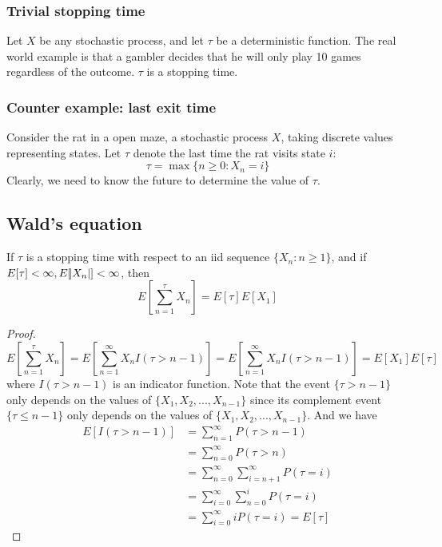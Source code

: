 \begin{refsection}
\subsubsection{Trivial stopping time}
Let $X$ be any stochastic process, and let $\tau$ be a deterministic function. The real world example is that a gambler decides that he will only play 10 games regardless of the outcome. $\tau$ is a stopping time. 

\subsubsection{Counter example: last exit time}
Consider the rat in a open maze, a stochastic process $X$, taking discrete values representing states. Let $\tau$ denote the last time the rat visits state $i$:
$$\tau = \max\{n\geq 0: X_n = i\}$$
Clearly, we need to know the future to determine the value of $\tau$.

\subsection{Wald's equation}
\begin{theorem}
If $\tau$ is a stopping time with respect to an iid sequence $\{X_n:n\geq 1\}$, and if $E[\tau] <\infty, E[\abs{X_n}] <\infty$, then
$$E[\sum_{n=1}^\tau X_n] = E[\tau]E[X_1]$$
\end{theorem}
\begin{proof}
$$E[\sum_{n=1}^\tau X_n] = E[\sum_{n=1}^\infty X_n I(\tau > n-1)]=E[\sum_{n=1}^\infty X_n I(\tau > n-1)]=E[X_1]E[\tau]$$
where $I(\tau > n-1)$ is an indicator function. Note that the event $\{\tau > n-1\}$ only depends on the values of $\{X_1,X_2,...,X_{n-1}\}$ since its complement event $\{\tau \leq n-1\}$ only depends on the values of $\{X_1,X_2,...,X_{n-1}\}$. And we have
\begin{align*}
    E[I(\tau > n-1)] &= \sum_{n=1}^\infty P(\tau > n-1) \\
    &=\sum_{n=0}^\infty P(\tau > n) \\
    &=\sum_{n=0}^\infty \sum_{i=n+1}^{\infty}P(\tau = i)\\
    &= \sum_{i=0}^{\infty} \sum_{n=0}^i P(\tau = i) \\
    &= \sum_{i=0}^{\infty} i P(\tau = i) = E[\tau]
\end{align*}
\end{proof}


\end{refsection}
